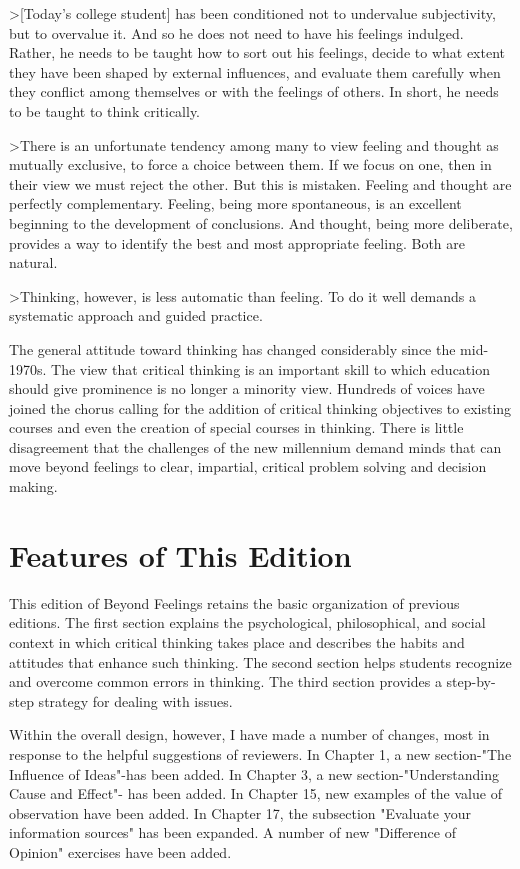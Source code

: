 \documentclass{book}
\begin{document}
>[Today’s college student] has been conditioned not to undervalue subjectivity, but to overvalue it. And so he does not need to have his feelings indulged. Rather, he needs to be taught how to sort out his feelings, decide to what extent they have been shaped by external influences, and evaluate them carefully when they conflict among themselves or with the feelings of others. In short, he needs to be taught to think critically.

>There is an unfortunate tendency among many to view feeling and thought as mutually exclusive, to force a choice between them. If we focus on one, then in their view we must reject the other. But this is mistaken. Feeling and thought are perfectly complementary. Feeling, being more spontaneous, is an excellent beginning to the development of conclusions. And thought, being more deliberate, provides a way to identify the best and most appropriate feeling. Both are natural.

>Thinking, however, is less automatic than feeling. To do it well demands a systematic approach and guided practice.

The general attitude toward thinking has changed considerably since the mid-1970s. The view that critical thinking is an important skill to which education should give prominence is no longer a minority view. Hundreds of voices have joined the chorus calling for the addition of critical thinking objectives to existing courses and even the creation of special courses in thinking. There is little disagreement that the challenges of the new millennium demand minds that can move beyond feelings to clear, impartial, critical problem solving and decision making.

\section{Features of This Edition}

This edition of Beyond Feelings retains the basic organization of previous editions. The first section explains the psychological, philosophical, and social context in which critical thinking takes place and describes the habits and attitudes that enhance such thinking. The second section helps students recognize and overcome common errors in thinking. The third section provides a step-by-step strategy for dealing with issues.

Within the overall design, however, I have made a number of changes, most in response to the helpful suggestions of reviewers.
In Chapter 1, a new section-"The Influence of Ideas"-has been added.
In Chapter 3, a new section-"Understanding Cause and Effect"- has been added.
In Chapter 15, new examples of the value of observation have been added.
In Chapter 17, the subsection "Evaluate your information sources" has been expanded.
A number of new "Difference of Opinion" exercises have been added.
\end{document}

